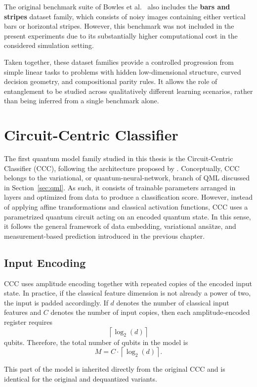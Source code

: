 \documentclass[12pt,a4paper,openany]{report}
\let\parencite\citep
\let\textcite\citet
\begin{document}
The original benchmark suite of Bowles et al.~\parencite{bowles2024better} also includes the \textbf{bars and stripes} dataset family, which consists of noisy images containing either vertical bars or horizontal stripes. However, this benchmark was not included in the present experiments due to its substantially higher computational cost in the considered simulation setting.

Taken together, these dataset families provide a controlled progression from simple linear tasks to problems with hidden low-dimensional structure, curved decision geometry, and compositional parity rules. It allows the role of entanglement to be studied across qualitatively different learning scenarios, rather than being inferred from a single benchmark alone.

\section{Circuit-Centric Classifier}
The first quantum model family studied in this thesis is the Circuit-Centric Classifier (CCC), following the architecture proposed by \textcite{schuld2018circuit}. Conceptually, CCC belongs to the variational, or quantum-neural-network, branch of QML discussed in Section~\ref{sec:qml}. As such, it consists of trainable parameters arranged in layers and optimized from data to produce a classification score. However, instead of applying affine transformations and classical activation functions, CCC uses a parametrized quantum circuit acting on an encoded quantum state. In this sense, it follows the general framework of data embedding, variational ans\"atze, and measurement-based prediction introduced in the previous chapter.

\subsection{Input Encoding}

CCC uses amplitude encoding together with repeated copies of the encoded input state. In practice, if the classical feature dimension is not already a power of two, the input is padded accordingly. If \(d\) denotes the number of classical input features and \(C\) denotes the number of input copies, then each amplitude-encoded register requires
\[
\left\lceil \log_2(d) \right\rceil
\]
qubits. Therefore, the total number of qubits in the model is
\[
M = C \cdot \left\lceil \log_2(d) \right\rceil .
\] 

This part of the model is inherited directly from the original CCC and is identical for the original and dequantized variants.
\end{document}
